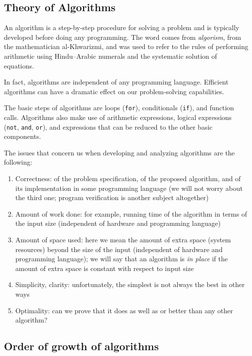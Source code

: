 \documentclass[justified, sixbynine]{tufte-book}
\def\ft{\small\tt}
\theoremstyle{plain}%
\newtheorem * {corollary}{Corollary}
\theoremstyle{definition}
\theoremstyle{remark}
\newtheorem * {remark}{Remark}
\newtheorem * {note}{Note}
\begin{document}
\begin{fullwidth}
\chapter{Theory of Algorithms}

An algorithm is a step-by-step procedure for solving a problem and is typically developed before doing any programming.
The word comes from {\it algorism}, from the mathematician al-Khwarizmi, and was used to refer to the rules of performing arithmetic using Hindu--Arabic numerals and the systematic solution of equations.

In fact, algorithms are independent
of any programming language. Efficient algorithms can have a dramatic effect
on our problem-solving capabilities.

The basic steps of algorithms are loops ({\ft for}), conditionals ({\ft if}), and function calls.
Algorithms also make use of arithmetic expressions, logical expressions ({\ft not}, {\ft and}, {\ft or}), and expressions that can be reduced to the other basic components.

The issues that concern us when developing and analyzing algorithms are the following:

\begin{enumerate}
\item  Correctness: of the problem specification, of the proposed algorithm, 
and of its implementation in some programming language (we will not worry
about the third one; program verification is another subject altogether)

\item  Amount of work done: for example, running time of the algorithm in terms of
the input size (independent of hardware and programming language)

\item  Amount of space used: here we mean the amount of extra space (system resources) beyond
the size of the input (independent of hardware and programming language);
we will say that an algorithm is {\em in place} if the amount of extra space
is constant with respect to input size

\item  Simplicity, clarity: unfortunately, the simplest is not always the
best in other ways

\item  Optimality: can we prove that it does as well as or better than any other algorithm?
\end{enumerate}

\goodbreak\section{Order of growth of algorithms}


\end{fullwidth}
\end{document}

